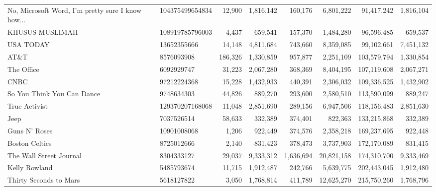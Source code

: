 \begin{longtable}{llrrrrrr}
 No, Microsoft Word, I'm pretty sure I know how... &  104375499654834 &  12,900 &   1,816,142 &    160,176 &   6,801,222 &  91,417,242 & 1,816,104 \\
                                   KHUSUS MUSLIMAH &  108919785796003 &   4,437 &     659,541 &    157,370 &   1,484,280 &  96,596,485 &   659,537 \\
                                         USA TODAY &      13652355666 &  14,148 &   4,811,684 &    743,660 &   8,359,085 &  99,102,661 & 7,451,132 \\
                                             AT\&T &       8576093908 & 186,326 &   1,330,859 &    957,877 &   2,251,109 & 103,579,794 & 1,330,854 \\
                                        The Office &       6092929747 &  31,223 &   2,067,280 &    368,369 &   8,404,195 & 107,119,608 & 2,067,271 \\
                                              CNBC &      97212224368 &  15,228 &   1,432,933 &    440,391 &   2,306,032 & 109,336,525 & 1,432,902 \\
                        So You Think You Can Dance &       9748634303 &  44,826 &     889,270 &    293,600 &   2,580,510 & 113,590,099 &   889,247 \\
                                     True Activist &  129370207168068 &  11,048 &   2,851,690 &    289,156 &   6,947,506 & 118,156,483 & 2,851,630 \\
                                              Jeep &       7037526514 &  58,633 &     332,389 &    374,401 &     822,363 & 133,215,868 &   332,389 \\
                                     Guns N' Roses &      10901008068 &   1,206 &     922,449 &    374,576 &   2,358,218 & 169,237,695 &   922,448 \\
                                    Boston Celtics &       8725012666 &   2,140 &     831,423 &    378,473 &   3,737,903 & 172,170,089 &   831,415 \\
                           The Wall Street Journal &       8304333127 &  29,037 &   9,333,312 &  1,636,694 &  20,821,158 & 174,310,700 & 9,333,469 \\
                                     Kelly Rowland &       5485793674 &  11,715 &   1,912,487 &    242,766 &   5,639,775 & 202,443,045 & 1,912,480 \\
                            Thirty Seconds to Mars &       5618127822 &   3,050 &   1,768,814 &    411,789 &  12,625,270 & 215,750,260 & 1,768,796 \\

\end{longtable}
